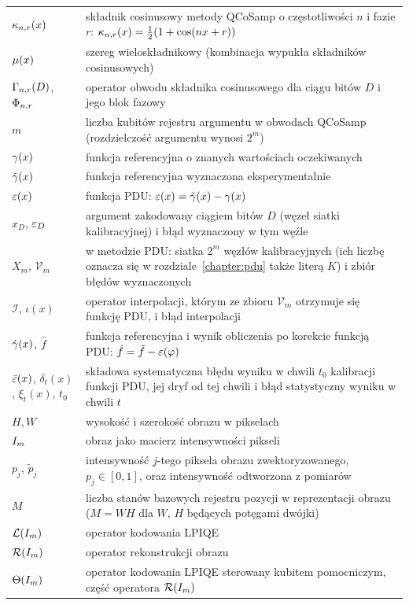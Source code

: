 \begin{longtable}{@{}p{}p{}@{}}
$\kappa_{n,r}(x)$ & składnik cosinusowy metody QCoSamp o częstotliwości $n$ i fazie $r$: $\kappa_{n,r}(x)=\frac{1}{2}(1+\cos(nx+r))$ \\
$\mu(x)$ & szereg wieloskładnikowy (kombinacja wypukła składników cosinusowych) \\
$\Gamma_{n,r}(D)$, $\Phi_{n,r}$ & operator obwodu składnika cosinusowego dla ciągu bitów $D$ i jego blok fazowy \\
$m$ & liczba kubitów rejestru argumentu w obwodach QCoSamp (rozdzielczość argumentu wynosi $2^m$) \\
$\gamma(x)$ & funkcja referencyjna o znanych wartościach oczekiwanych \\
$\tilde{\gamma}(x)$ & funkcja referencyjna wyznaczona eksperymentalnie \\
$\varepsilon(x)$ & funkcja PDU: $\varepsilon(x)=\tilde{\gamma}(x)-\gamma(x)$ \\
$x_D$, $\varepsilon_D$ & argument zakodowany ciągiem bitów $D$ (węzeł siatki kalibracyjnej) i błąd wyznaczony w tym węźle \\
$X_m$, $\mathcal{V}_m$ & w metodzie PDU: siatka $2^m$ węzłów kalibracyjnych (ich liczbę oznacza się w rozdziale~\ref{chapter:pdu} także literą $K$) i zbiór błędów wyznaczonych \\
$\mathcal{I}$, $\iota(x)$ & operator interpolacji, którym ze zbioru $\mathcal{V}_m$ otrzymuje się funkcję PDU, i błąd interpolacji \\
$\hat{\gamma}(x)$, $\hat{f}$ & funkcja referencyjna i wynik obliczenia po korekcie funkcją PDU: $\hat{f}=\tilde{f}-\varepsilon(\varphi)$ \\
$\bar{\varepsilon}(x)$, $\delta_t(x)$, $\xi_t(x)$, $t_0$ & składowa systematyczna błędu wyniku w chwili $t_0$ kalibracji funkcji PDU, jej dryf od tej chwili i błąd statystyczny wyniku w chwili $t$ \\
$H, W$ & wysokość i szerokość obrazu w pikselach \\
$I_m$ & obraz jako macierz intensywności pikseli \\
$p_j$, $\tilde{p}_j$ & intensywność $j$-tego piksela obrazu zwektoryzowanego, $p_j\in[0,1]$, oraz intensywność odtworzona z pomiarów \\
$M$ & liczba stanów bazowych rejestru pozycji w reprezentacji obrazu ($M=WH$ dla $W$, $H$ będących potęgami dwójki) \\
$\mathcal{L}(I_m)$ & operator kodowania LPIQE \\
$\mathcal{R}(I_m)$ & operator rekonstrukcji obrazu \\
$\Theta(I_m)$ & operator kodowania LPIQE sterowany kubitem pomocniczym, część operatora $\mathcal{R}(I_m)$ \\

\end{longtable}
